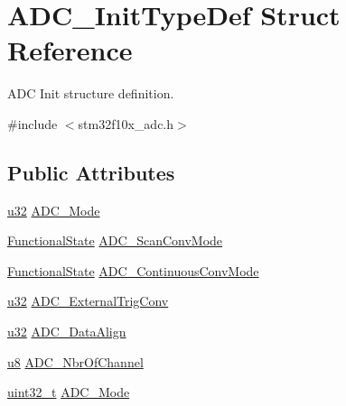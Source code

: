 \hypertarget{struct_a_d_c___init_type_def}{}\section{A\+D\+C\+\_\+\+Init\+Type\+Def Struct Reference}
\label{struct_a_d_c___init_type_def}


A\+DC Init structure definition.  




{\ttfamily \#include $<$stm32f10x\+\_\+adc.\+h$>$}

\subsection*{Public Attributes}
\begin{DoxyCompactItemize}
\item 
\hyperlink{agilefox_2library_2inc_2stm32f10x__type_8h_a2caf5cd7bcdbe1eefa727f44ffb10bac}{u32} \hyperlink{struct_a_d_c___init_type_def_a16d43a4aad5a8e32d7f628e29b07efa6}{A\+D\+C\+\_\+\+Mode}
\item 
\hyperlink{agilefox_2library_2inc_2stm32f10x__type_8h_ac9a7e9a35d2513ec15c3b537aaa4fba1}{Functional\+State} \hyperlink{struct_a_d_c___init_type_def_aaf44f54f22ab40bf8fae01f075aa4c87}{A\+D\+C\+\_\+\+Scan\+Conv\+Mode}
\item 
\hyperlink{agilefox_2library_2inc_2stm32f10x__type_8h_ac9a7e9a35d2513ec15c3b537aaa4fba1}{Functional\+State} \hyperlink{struct_a_d_c___init_type_def_a2149036a332281e70a36879a2396b8d1}{A\+D\+C\+\_\+\+Continuous\+Conv\+Mode}
\item 
\hyperlink{agilefox_2library_2inc_2stm32f10x__type_8h_a2caf5cd7bcdbe1eefa727f44ffb10bac}{u32} \hyperlink{struct_a_d_c___init_type_def_a11c85e5c9dd59bcabaf70afb95f45db3}{A\+D\+C\+\_\+\+External\+Trig\+Conv}
\item 
\hyperlink{agilefox_2library_2inc_2stm32f10x__type_8h_a2caf5cd7bcdbe1eefa727f44ffb10bac}{u32} \hyperlink{struct_a_d_c___init_type_def_ab4e268675ad296dd7b8016052d24043c}{A\+D\+C\+\_\+\+Data\+Align}
\item 
\hyperlink{agilefox_2library_2inc_2stm32f10x__type_8h_aed742c436da53c1080638ce6ef7d13de}{u8} \hyperlink{struct_a_d_c___init_type_def_aa7c965459c14f15b1143cfc24ba1ebe9}{A\+D\+C\+\_\+\+Nbr\+Of\+Channel}
\item 
\hyperlink{_p_e___types_8h_a33594304e786b158f3fb30289278f5af}{uint32\+\_\+t} \hyperlink{struct_a_d_c___init_type_def_a0f9ec17ad585d66a54625213062c9260}{A\+D\+C\+\_\+\+Mode}

\end{DoxyCompactItemize}
